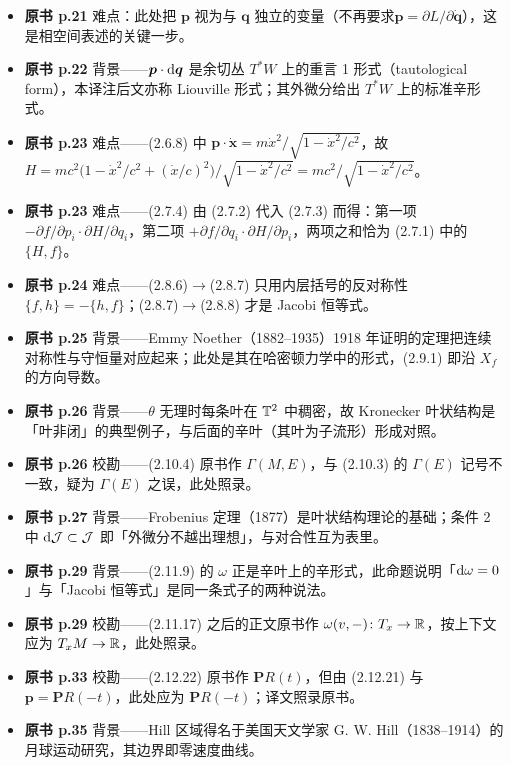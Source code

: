 \begin{itemize}[leftmargin=2.4em,itemsep=4pt,label={\textbullet}]
\item \textbf{原书 p.21} 难点：此处把 $\bm{p}$ 视为与 $\bm{q}$ 独立的变量（不再要求$\bm{p}=\partial L/\partial\dot{\bm{q}}$），这是相空间表述的关键一步。
\item \textbf{原书 p.22} 背景——$\bm{p}\cdot\mathrm{d}\bm{q}$ 是余切丛 $T^*W$ 上的重言 1 形式（tautological form），本译注后文亦称 Liouville 形式；其外微分给出 $T^*W$ 上的标准辛形式。
\item \textbf{原书 p.23} 难点——(2.6.8) 中 $\bm{p}\cdot\dot{\bm{x}}=m\dot{x}^2/\sqrt{1-\dot{x}^2/c^2}$，故 $H=mc^2\bigl(1-\dot{x}^2/c^2+(\dot{x}/c)^2\bigr)/\sqrt{1-\dot{x}^2/c^2}=mc^2/\sqrt{1-\dot{x}^2/c^2}$。
\item \textbf{原书 p.23} 难点——(2.7.4) 由 (2.7.2) 代入 (2.7.3) 而得：第一项 $-\partial f/\partial p_i\cdot\partial H/\partial q_i$，第二项 $+\partial f/\partial q_i\cdot\partial H/\partial p_i$，两项之和恰为 (2.7.1) 中的 $\{H,f\}$。
\item \textbf{原书 p.24} 难点——(2.8.6)$\to$(2.8.7) 只用内层括号的反对称性 $\{f,h\}=-\{h,f\}$；(2.8.7)$\to$(2.8.8) 才是 Jacobi 恒等式。
\item \textbf{原书 p.25} 背景——Emmy Noether（1882--1935）1918 年证明的定理把连续对称性与守恒量对应起来；此处是其在哈密顿力学中的形式，(2.9.1) 即沿 $X_f$ 的方向导数。
\item \textbf{原书 p.26} 背景——$\theta$ 无理时每条叶在 $\mathbb{T}^2$ 中稠密，故 Kronecker 叶状结构是「叶非闭」的典型例子，与后面的辛叶（其叶为子流形）形成对照。
\item \textbf{原书 p.26} 校勘——(2.10.4) 原书作 $\Gamma(M,E)$，与 (2.10.3) 的 $\Gamma(E)$ 记号不一致，疑为 $\Gamma(E)$ 之误，此处照录。
\item \textbf{原书 p.27} 背景——Frobenius 定理（1877）是叶状结构理论的基础；条件 2 中 $\mathrm{d}\mathcal{J}\subset\mathcal{J}$ 即「外微分不越出理想」，与对合性互为表里。
\item \textbf{原书 p.29} 背景——(2.11.9) 的 $\omega$ 正是辛叶上的辛形式，此命题说明「$\mathrm{d}\omega=0$」与「Jacobi 恒等式」是同一条式子的两种说法。
\item \textbf{原书 p.29} 校勘——(2.11.17) 之后的正文原书作 $\omega(v,-)\colon T_x\to\mathbb{R}$，按上下文应为 $T_xM\to\mathbb{R}$，此处照录。
\item \textbf{原书 p.33} 校勘——(2.12.22) 原书作 $\bm{P}R(t)$，但由 (2.12.21) 与 $\bm{p}=\bm{P}R(-t)$，此处应为 $\bm{P}R(-t)$；译文照录原书。
\item \textbf{原书 p.35} 背景——Hill 区域得名于美国天文学家 G. W. Hill（1838--1914）的月球运动研究，其边界即零速度曲线。
\end{itemize}

